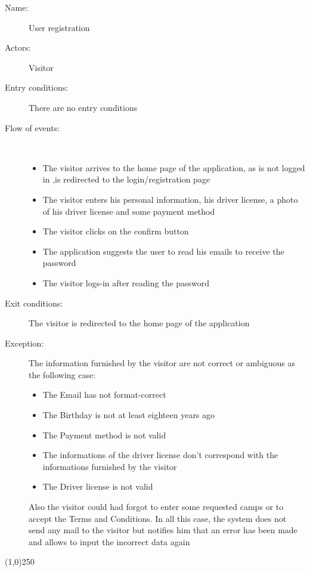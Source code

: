 \begin{description}
	\item[Name:] User registration
	\item[Actors:] Visitor
	\item[Entry conditions:] There are no entry conditions
	\item[Flow of events:]  \ \\
		\begin{itemize}
			\item The visitor arrives to the home page of the application, as is not logged in ,is redirected to the login/registration page
			\item The visitor enters his personal information, his driver license, a photo of his driver license and some payment method
			\item The visitor clicks on the confirm button
			\item The application suggests the user to read his emails to receive the password
			\item The visitor logs-in after reading the password
		\end{itemize}
	\item[Exit conditions:] The visitor is redirected to the home page of the application
	\item [Exception:] The information furnished by the visitor are not correct or ambiguous as the following case:
		\begin{itemize}
			\item The Email has not format-correct
			\item The Birthday is not at least eighteen years ago
			\item The Payment method is not valid
			\item The informations of the driver license don't correspond with the informations furnished by the visitor
			\item The Driver license is not valid
		\end {itemize}
		Also the visitor could had forgot to enter some requested camps or to accept the Terms and Conditions. In all this case, the system does not send any mail to the visitor but notifies him that an error has been made and allows to input the incorrect data again
	\end{description}
	
\begin{center}
\line(1,0){250}
\end{center}

